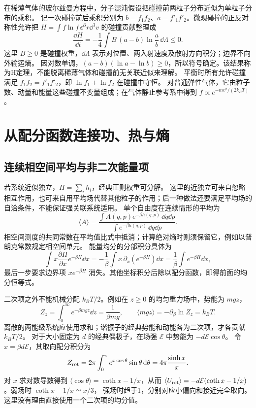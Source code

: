 在稀薄气体的玻尔兹曼方程中，分子混沌假设把碰撞前两粒子分布近似为单粒子分布的乘积。
记一次碰撞前后乘积分别为 $b=f_1f_2$、$a=f'_1f'_2$。微观碰撞的正反对称性允许把
$H=\int f\ln f\,\dd^3r\dd^3v$ 的碰撞贡献整理成
\[\frac{\dd H}{\dd t}=-\frac14\int B\,(a-b)\ln\frac ab\,\dd\Lambda\le0.\]
这里 $B\ge0$ 是碰撞权重，$\dd\Lambda$ 表示对位置、两入射速度及散射方向积分；边界不向外输运熵。
因对数单调，$(a-b)(\ln a-\ln b)\ge0$，所以符号确定。该结果称为H定理，不能脱离稀薄气体和碰撞前无关联近似来理解。
平衡时所有允许碰撞满足 $f_1f_2=f'_1f'_2$，即 $\ln f_1+\ln f_2$ 在碰撞中守恒。
对普通弹性气体，它由粒子数、动量和能量这些碰撞不变量组成；在气体静止参考系中得到 $f\propto e^{-mv^2/(2k_BT)}$。

\section{从配分函数连接功、热与熵}

\subsection{连续相空间平均与非二次能量项}

若系统近似独立，$H=\sum_ih_i$，经典正则权重可分解。
这里的近独立可来自忽略相互作用，也可来自用平均场代替其他粒子的作用；后一种做法还要满足平均场的自洽条件，不能保证强关联系统适用。
单个自由度在连续情形的平均为
\[\langle A\rangle=
\frac{\int A(q,p)e^{-\beta h(q,p)}\,\dd q\dd p}
{\int e^{-\beta h(q,p)}\,\dd q\dd p}.\]
相空间测度的共同常数在平均值比式中抵消；计算绝对熵时则须保留它，例如以普朗克常数规定相空间单元。
能量均分的分部积分具体为
\[\int x\frac{\partial H}{\partial x}e^{-\beta H}\dd x
=-\frac1\beta\int x\,\partial_x(e^{-\beta H})\dd x
=\frac1\beta\int e^{-\beta H}\dd x,\]
最后一步要求边界项 $xe^{-\beta H}$ 消失。其他坐标积分后除以配分函数，即得前面的均分恒等式。

二次项之外不能机械分配 $k_BT/2$。例如在 $z\ge0$ 的均匀重力场中，势能为 $mgz$，
\[Z_z=\int_0^\infty e^{-\beta mgz}\dd z=\frac1{\beta mg},
\qquad \langle mgz\rangle=-\partial_\beta\ln Z_z=k_BT.\]
离散的两能级系统应使用求和；谐振子的经典势能和动能各为二次项，才各贡献 $k_BT/2$。
对于大小固定为 $d$ 的经典偶极子，在场强 $\mathcal E$ 中势能为 $-d\mathcal E\cos\theta$。
令 $x=\beta d\mathcal E$，其取向配分积分为
\[Z_{\rm rot}=2\pi\int_0^\pi e^{x\cos\theta}\sin\theta\mathop{}\!\mathrm d\theta
=4\pi\frac{\sinh x}{x}.\]
对 $x$ 求对数导数得到 $\langle\cos\theta\rangle=\coth x-1/x$，从而
$\langle U_{\rm rot}\rangle=-d\mathcal E(\coth x-1/x)$。弱场时 $\coth x-1/x\simeq x/3$，
强场时趋于1，分别对应小偏向和接近完全取向。这里没有理由直接使用一个二次项的均分值。

